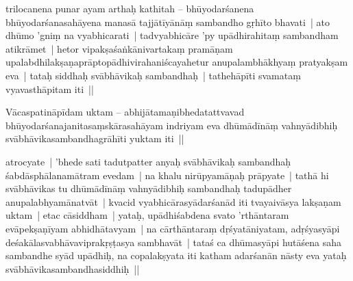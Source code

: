 \documentclass[article,12pt,a4paper]{memoir}%
\newcommand{\persName}[1]{#1}
\newcounter{parCount}
\begin{document}
	  \pstart \leavevmode%
	\label{thakur75-46.27}\persName{trilocanena} punar ayam arthaḥ kathitah – \label{sarit__ratnakīrtinibandhāvali__125156}bhūyodarśanena bhūyodarśanasahāyena manasā tajjātīyānāṃ sambandho gṛhīto bhavati | ato dhūmo 'gniṃ na vyabhicarati | tadvyabhicāre 'py upādhirahitaṃ sambandham atikrāmet | hetor vipakṣaśaṅkānivartakaṃ pramāṇam upalabdhilakṣaṇaprāptopādhivirahaniścayahetur anupalambhākhyaṃ pratyakṣam eva | tataḥ siddhaḥ svābhāvikaḥ sambandhaḥ | tathehāpīti svamataṃ vyavasthāpitam iti ||\label{sarit__ratnakīrtinibandhāvali__125583}
	{}
	\pend%
      

	  \pstart \leavevmode%
	\label{thakur75-47.1}Vācaspatināpīdam uktam – abhijātamaṇibhedatattvavad bhūyodarśanajanitasaṃskārasahāyam indriyam eva dhūmādīnāṃ vahnyādibhiḥ svābhāvikasambandhagrāhīti yuktam iti ||
	{}
	\pend%
      

	  \pstart \leavevmode%
	\label{thakur75-47.3}atrocyate | \label{ratnakīrtinibandhāvali__36r1PF7IMVLODEE7RZ9HXOTB6GW}'bhede\label{ratnakīrtinibandhāvali__36r1PF7IMVKUPK1QFXFUAIMYDBD} sati tadutpatter anyaḥ svābhāvikaḥ sambandhaḥ śabdāsphālanamātram evedam | na khalu nirūpyamāṇaḥ prāpyate | tathā hi svābhāvikas tu dhūmādīnāṃ vahnyādibhiḥ sambandhaḥ tadupādher anupalabhyamānatvāt | kvacid vyabhicārasyādarśanād iti tvayaivāsya lakṣaṇam uktam | etac cāsiddham | yataḥ, upādhiśabdena svato 'rthāntaram evāpekṣaṇīyam abhidhātavyam | na cārthāntaraṃ dṛśyatāniyatam, adṛśyasyāpi deśakālasvabhāvaviprakṛṣṭasya sambhavāt | tataś ca dhūmasyāpi hutāśena saha sambandhe syād upādhiḥ, na copalakṣyata iti katham adarśanān nāsty eva yataḥ svābhāvikasambandhasiddhiḥ ||
	{}
	\pend%
      
\end{document}
